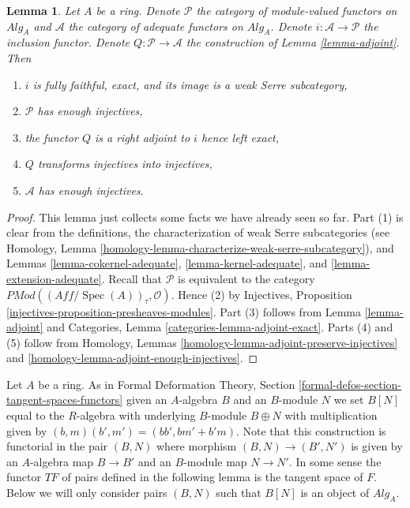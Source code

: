 \documentclass{stacks-project}
\theoremstyle{plain}
\newtheorem{lemma}[subsection]{Lemma}
\theoremstyle{definition}
\theoremstyle{remark}
\numberwithin{equation}{subsection}
\def\Spec{\mathop{\mathrm{Spec}}}
\begin{document}
\begin{lemma}
\label{lemma-enough-injectives}
Let $A$ be a ring. Denote $\mathcal{P}$ the category of module-valued
functors on $\textit{Alg}_A$ and $\mathcal{A}$ the category of adequate
functors on $\textit{Alg}_A$. Denote $i : \mathcal{A} \to \mathcal{P}$
the inclusion functor. Denote $Q : \mathcal{P} \to \mathcal{A}$
the construction of Lemma \ref{lemma-adjoint}.
Then
\begin{enumerate}
\item $i$ is fully faithful, exact, and its image is a weak Serre subcategory,
\item $\mathcal{P}$ has enough injectives,
\item the functor $Q$ is a right adjoint to $i$ hence left exact,
\item $Q$ transforms injectives into injectives,
\item $\mathcal{A}$ has enough injectives.
\end{enumerate}
\end{lemma}

\begin{proof}
This lemma just collects some facts we have already seen so far.
Part (1) is clear from the definitions, the characterization of
weak Serre subcategories (see
Homology, Lemma \ref{homology-lemma-characterize-weak-serre-subcategory}),
and
Lemmas \ref{lemma-cokernel-adequate}, \ref{lemma-kernel-adequate},
and \ref{lemma-extension-adequate}.
Recall that $\mathcal{P}$ is equivalent to the category
$\textit{PMod}((\textit{Aff}/\Spec(A))_\tau, \mathcal{O})$.
Hence (2) by
Injectives, Proposition \ref{injectives-proposition-presheaves-modules}.
Part (3) follows from
Lemma \ref{lemma-adjoint}
and
Categories, Lemma \ref{categories-lemma-adjoint-exact}.
Parts (4) and (5) follow from
Homology, Lemmas \ref{homology-lemma-adjoint-preserve-injectives} and
\ref{homology-lemma-adjoint-enough-injectives}.
\end{proof}

\noindent
Let $A$ be a ring. As in
Formal Deformation Theory, Section
\ref{formal-defos-section-tangent-spaces-functors}
given an $A$-algebra $B$ and an $B$-module $N$ we set $B[N]$ equal to
the $R$-algebra with underlying $B$-module $B \oplus N$ with multiplication
given by $(b, m)(b', m ') = (bb', bm' + b'm)$. Note that this construction
is functorial in the pair $(B, N)$ where morphism $(B, N) \to (B', N')$
is given by an $A$-algebra map $B \to B'$ and an $B$-module map
$N \to N'$. In some sense the functor $TF$ of pairs defined in the following
lemma is the tangent space of $F$.
Below we will only consider pairs $(B, N)$ such that
$B[N]$ is an object of $\textit{Alg}_A$.
\end{document}
